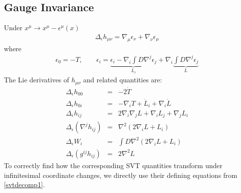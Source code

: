 \documentclass[10pt,letterpaper]{article}
\numberwithin{equation}{section}
\begin{document}
\subsection{Gauge Invariance}
%
%
Under $x^\mu \to x^\mu - \epsilon^\mu(x)$
\begin{eqnarray}
\Delta_\epsilon h_{\mu\nu} = \nabla_\mu \epsilon_\nu + \nabla_\nu \epsilon_\mu
\end{eqnarray}
where
\begin{eqnarray}
\epsilon_0 = -T,\qquad \epsilon_i = \underbrace{ \epsilon_i - \nabla_i \int D \nabla^j \epsilon_j}_{L_i} + 
\nabla_i \underbrace{ \int D \nabla^j \epsilon_j}_{L} 
\end{eqnarray}
The Lie derivatives of $h_{\mu\nu}$ and related quantities are:
\begin{eqnarray}
\Delta_\epsilon h_{00} &=& -2\dot T
\nonumber\\
\Delta_\epsilon h_{0i} &=& -\nabla_i T + \dot L_i + \nabla_i \dot L
\nonumber\\
\Delta_\epsilon h_{ij} &=& 2\nabla_i\nabla_j L + \nabla_i L_j + \nabla_j L_i 
\nonumber\\
\Delta_\epsilon (\nabla^j h_{ij})&=& \nabla^2(2 \nabla_i L + L_i)
\nonumber\\
\Delta_\epsilon W_i &=& \int D \nabla^2 (2\nabla_i L + L_i)
\nonumber\\
\Delta_\epsilon (g^{ij}h_{ij}) &=& 2\nabla^2 L
\end{eqnarray}
To correctly find how the corresponding SVT quantities transform under infinitesimal coordinate changes, we directly use their defining equations from \eqref{svtdecomp1}. 
\end{document}
